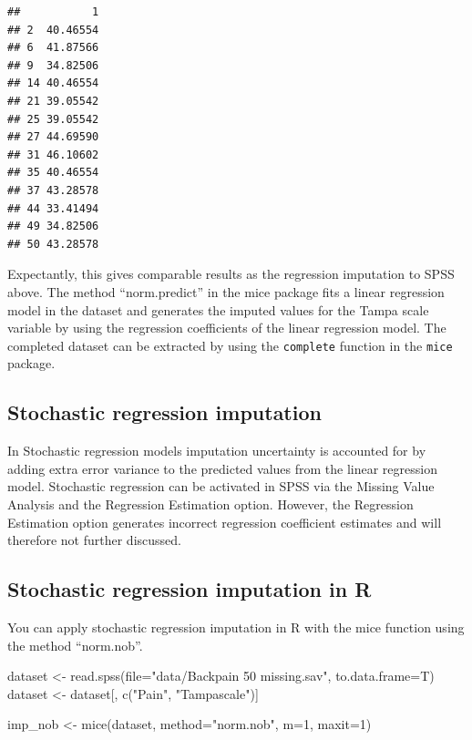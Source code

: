 \documentclass[
]{book}
\newenvironment{Shaded}{\begin{snugshade}}{\end{snugshade}}
\newcommand{\AttributeTok}[1]{\textcolor[rgb]{0.77,0.63,0.00}{#1}}
\newcommand{\DecValTok}[1]{\textcolor[rgb]{0.00,0.00,0.81}{#1}}
\newcommand{\FunctionTok}[1]{\textcolor[rgb]{0.00,0.00,0.00}{#1}}
\newcommand{\NormalTok}[1]{#1}
\newcommand{\OtherTok}[1]{\textcolor[rgb]{0.56,0.35,0.01}{#1}}
\newcommand{\StringTok}[1]{\textcolor[rgb]{0.31,0.60,0.02}{#1}}
\begin{document}
\begin{verbatim}
##           1
## 2  40.46554
## 6  41.87566
## 9  34.82506
## 14 40.46554
## 21 39.05542
## 25 39.05542
## 27 44.69590
## 31 46.10602
## 35 40.46554
## 37 43.28578
## 44 33.41494
## 49 34.82506
## 50 43.28578
\end{verbatim}

Expectantly, this gives comparable results as the regression imputation to SPSS above. The method ``norm.predict'' in the mice package fits a linear regression model in the dataset and generates the imputed values for the Tampa scale variable by using the regression coefficients of the linear regression model. The completed dataset can be extracted by using the \texttt{complete} function in the \texttt{mice} package.

\hypertarget{stochastic-regression-imputation}{%
\subsection{Stochastic regression imputation}\label{stochastic-regression-imputation}}

In Stochastic regression models imputation uncertainty is accounted for by adding extra error variance to the predicted values from the linear regression model. Stochastic regression can be activated in SPSS via the Missing Value Analysis and the Regression Estimation option. However, the Regression Estimation option generates incorrect regression coefficient estimates \citep{hippel2004} and will therefore not further discussed.

\hypertarget{stochastic-regression-imputation-in-r}{%
\subsection{Stochastic regression imputation in R}\label{stochastic-regression-imputation-in-r}}

You can apply stochastic regression imputation in R with the mice function using the method ``norm.nob''.

\begin{Shaded}
\begin{Highlighting}[]
\NormalTok{dataset }\OtherTok{\textless{}{-}} \FunctionTok{read.spss}\NormalTok{(}\AttributeTok{file=}\StringTok{"data/Backpain 50 missing.sav"}\NormalTok{, }\AttributeTok{to.data.frame=}\NormalTok{T)}
\NormalTok{dataset }\OtherTok{\textless{}{-}}\NormalTok{ dataset[, }\FunctionTok{c}\NormalTok{(}\StringTok{"Pain"}\NormalTok{, }\StringTok{"Tampascale"}\NormalTok{)]}

\NormalTok{imp\_nob }\OtherTok{\textless{}{-}} \FunctionTok{mice}\NormalTok{(dataset, }\AttributeTok{method=}\StringTok{"norm.nob"}\NormalTok{, }\AttributeTok{m=}\DecValTok{1}\NormalTok{, }\AttributeTok{maxit=}\DecValTok{1}\NormalTok{)}
\end{Highlighting}
\end{Shaded}
\end{document}
